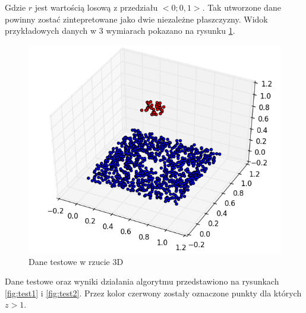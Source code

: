 Gdzie $r$ jest wartością losową z przedziału $<0;0,1>$. Tak utworzone dane powinny zostać zintepretowane jako
dwie niezależne płaszczyzny. Widok przykładowych danych w 3 wymiarach pokazano na rysunku \ref{fig:dane_zerowe}.

\begin{figure}[h!]
    \centering
    \includegraphics[width=0.6\linewidth]{img/test0.png}
    \caption{Dane testowe w rzucie 3D}
    \label{fig:dane_zerowe}
\end{figure}

Dane testowe oraz wyniki działania algorytmu przedstawiono na rysunkach \ref{fig:test1} i \ref{fig:test2}.
Przez kolor czerwony zostały oznaczone punkty dla których $z > 1$.

